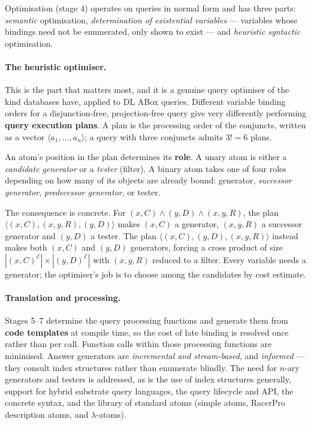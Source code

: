 \documentclass[11pt,a4paper,DIV=12,parskip=half]{scrartcl}
\begin{document}
Optimisation (stage 4) operates on queries in normal form and has three parts:
\emph{semantic} optimisation, \emph{determination of existential variables} ---
variables whose bindings need not be enumerated, only shown to exist --- and
\emph{heuristic syntactic} optimisation.

\paragraph{The heuristic optimiser.}
This is the part that matters most, and it is a genuine query optimiser of the
kind databases have, applied to DL ABox queries. Different variable binding
orders for a disjunction-free, projection-free query give very differently
performing \textbf{query execution plans}. A plan is the processing order of the
conjuncts, written as a vector $\langle a_1, \ldots, a_n \rangle$; a query with
three conjuncts admits $3! = 6$ plans.

An atom's position in the plan determines its \textbf{role}. A unary atom is
either a \emph{candidate generator} or a \emph{tester} (filter). A binary atom
takes one of four roles depending on how many of its objects are already bound:
generator, \emph{successor generator}, \emph{predecessor generator}, or tester.

The consequence is concrete. For $(x,C) \wedge (y,D) \wedge (x,y,R)$, the plan
$\langle (x,C), (x,y,R), (y,D) \rangle$ makes $(x,C)$ a generator, $(x,y,R)$ a
successor generator and $(y,D)$ a tester. The plan $\langle (x,C), (y,D),
(x,y,R) \rangle$ instead makes both $(x,C)$ and $(y,D)$ generators, forcing a
cross product of size $|(x,C)^{\mathcal{E}}| \times |(y,D)^{\mathcal{E}}|$ with
$(x,y,R)$ reduced to a filter. Every variable needs a generator; the optimiser's
job is to choose among the candidates by cost estimate.

\paragraph{Translation and processing.}
Stages 5--7 determine the query processing functions and generate them from
\textbf{code templates} at compile time, so the cost of late binding is resolved
once rather than per call. Function calls within those processing functions are
minimised. Answer generators are \emph{incremental and stream-based}, and
\emph{informed} --- they consult index structures rather than enumerate blindly.
The need for $n$-ary generators and testers is addressed, as is the use of index
structures generally, support for hybrid substrate query languages, the query
lifecycle and API, the concrete syntax, and the library of standard atoms
(simple atoms, RacerPro description atoms, and $\lambda$-atoms).
\end{document}
